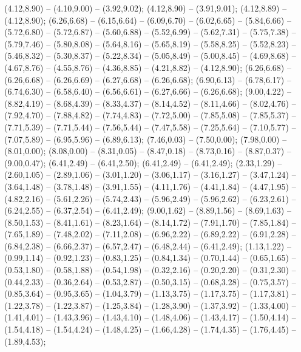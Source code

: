 { (4.12,8.90) -- (4.10,9.00) -- (3.92,9.02);
 (4.12,8.90) -- (3.91,9.01);
 (4.12,8.89) -- (4.12,8.90);
 (6.26,6.68) -- (6.15,6.64) -- (6.09,6.70) -- (6.02,6.65) -- (5.84,6.66) -- (5.72,6.80) -- (5.72,6.87) -- (5.60,6.88) -- (5.52,6.99) -- (5.62,7.31) -- (5.75,7.38) -- (5.79,7.46) -- (5.80,8.08) -- (5.64,8.16) -- (5.65,8.19) -- (5.58,8.25) -- (5.52,8.23) -- (5.46,8.32) -- (5.30,8.37) -- (5.22,8.34) -- (5.05,8.49) -- (5.00,8.45) -- (4.69,8.68) -- (4.67,8.76) -- (4.55,8.76) -- (4.36,8.85) -- (4.21,8.82) -- (4.12,8.90);
 (6.26,6.68) -- (6.26,6.68) -- (6.26,6.69) -- (6.27,6.68) -- (6.26,6.68);
 (6.90,6.13) -- (6.78,6.17) -- (6.74,6.30) -- (6.58,6.40) -- (6.56,6.61) -- (6.27,6.66) -- (6.26,6.68);
 (9.00,4.22) -- (8.82,4.19) -- (8.68,4.39) -- (8.33,4.37) -- (8.14,4.52) -- (8.11,4.66) -- (8.02,4.76) -- (7.92,4.70) -- (7.88,4.82) -- (7.74,4.83) -- (7.72,5.00) -- (7.85,5.08) -- (7.85,5.37) -- (7.71,5.39) -- (7.71,5.44) -- (7.56,5.44) -- (7.47,5.58) -- (7.25,5.64) -- (7.10,5.77) -- (7.07,5.89) -- (6.95,5.96) -- (6.89,6.13);
 (7.46,0.03) -- (7.50,0.00);
 (7.98,0.00) -- (8.01,0.00);
 (8.08,0.00) -- (8.31,0.05) -- (8.47,0.18) -- (8.73,0.16) -- (8.87,0.37) -- (9.00,0.47);
 (6.41,2.49) -- (6.41,2.50);
 (6.41,2.49) -- (6.41,2.49);
 (2.33,1.29) -- (2.60,1.05) -- (2.89,1.06) -- (3.01,1.20) -- (3.06,1.17) -- (3.16,1.27) -- (3.47,1.24) -- (3.64,1.48) -- (3.78,1.48) -- (3.91,1.55) -- (4.11,1.76) -- (4.41,1.84) -- (4.47,1.95) -- (4.82,2.16) -- (5.61,2.26) -- (5.74,2.43) -- (5.96,2.49) -- (5.96,2.62) -- (6.23,2.61) -- (6.24,2.55) -- (6.37,2.54) -- (6.41,2.49);
 (9.00,1.62) -- (8.89,1.56) -- (8.69,1.63) -- (8.50,1.53) -- (8.41,1.61) -- (8.23,1.64) -- (8.14,1.72) -- (7.91,1.70) -- (7.85,1.84) -- (7.65,1.89) -- (7.48,2.02) -- (7.11,2.08) -- (6.96,2.22) -- (6.89,2.22) -- (6.91,2.28) -- (6.84,2.38) -- (6.66,2.37) -- (6.57,2.47) -- (6.48,2.44) -- (6.41,2.49);
 (1.13,1.22) -- (0.99,1.14) -- (0.92,1.23) -- (0.83,1.25) -- (0.84,1.34) -- (0.70,1.44) -- (0.65,1.65) -- (0.53,1.80) -- (0.58,1.88) -- (0.54,1.98) -- (0.32,2.16) -- (0.20,2.20) -- (0.31,2.30) -- (0.44,2.33) -- (0.36,2.64) -- (0.53,2.87) -- (0.50,3.15) -- (0.68,3.28) -- (0.75,3.57) -- (0.85,3.64) -- (0.95,3.65) -- (1.04,3.79) -- (1.13,3.75) -- (1.17,3.75) -- (1.17,3.81) -- (1.22,3.78) -- (1.22,3.87) -- (1.25,3.84) -- (1.28,3.90) -- (1.37,3.92) -- (1.33,4.00) -- (1.41,4.01) -- (1.43,3.96) -- (1.43,4.10) -- (1.48,4.06) -- (1.43,4.17) -- (1.50,4.14) -- (1.54,4.18) -- (1.54,4.24) -- (1.48,4.25) -- (1.66,4.28) -- (1.74,4.35) -- (1.76,4.45) -- (1.89,4.53);
}
